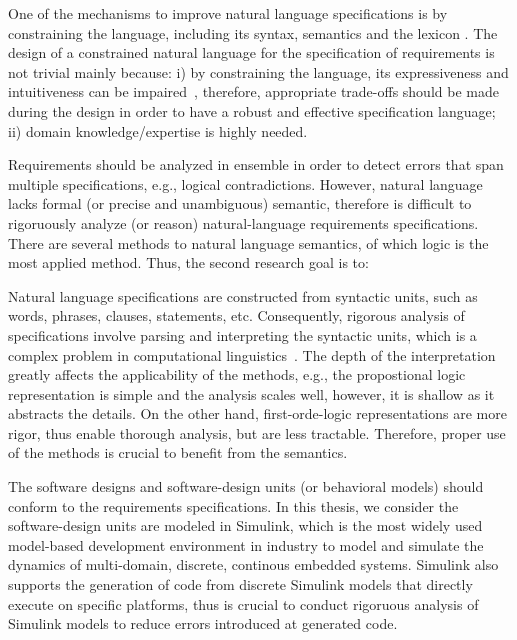 One of the mechanisms to improve natural language specifications is by constraining the language, including its syntax, semantics and the lexicon \cite{Kuhn2014ALanguages}. The design of a constrained natural language for the specification of requirements is not trivial mainly because: i) by constraining the language, its expressiveness and intuitiveness can be impaired~\cite{ieereqspecstandard}\cite{Myachykov2013SyntacticRussian}, therefore, appropriate trade-offs should be made during the design in order to have a robust and effective specification language; ii) domain knowledge/expertise is highly needed.

Requirements should be analyzed in ensemble in order to detect errors that span multiple specifications, e.g., logical contradictions. However, natural language lacks formal (or precise and unambiguous) semantic, therefore is difficult to rigoruously analyze (or reason) natural-language requirements specifications. There are several methods to natural language semantics, of which logic is the most applied method. Thus, the second research goal is to:
\begin{researchgoal}
\end{researchgoal}

Natural language specifications are constructed from syntactic units, such as words, phrases, clauses, statements, etc. Consequently, rigorous analysis of specifications involve parsing and interpreting the syntactic units, which is a complex problem in computational linguistics~\cite{Clark2010TheProcessing}. The depth of the interpretation greatly affects the applicability of the methods, e.g., the propostional logic representation is simple and the analysis scales well, however, it is shallow as it abstracts the details. On the other hand, first-orde-logic representations are more rigor, thus enable thorough analysis, but are less tractable. Therefore, proper use of the methods is crucial to benefit from the semantics.

The software designs and software-design units (or behavioral models) should conform to the requirements specifications. In this thesis, we consider the software-design units are modeled in Simulink, which is the most widely used model-based development environment in industry to model and simulate the dynamics of multi-domain, discrete, continous embedded systems. Simulink also supports the generation of code from discrete Simulink models that directly execute on specific platforms, thus is crucial to conduct rigoruous analysis of Simulink models to reduce errors introduced at generated code. 

